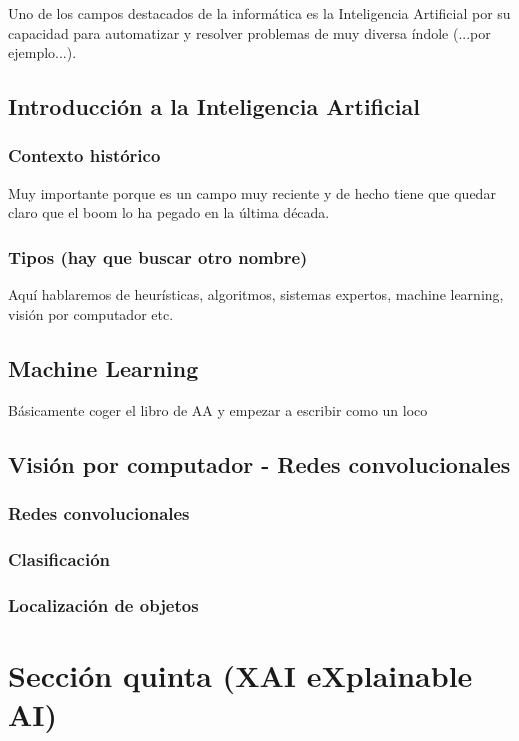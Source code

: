 \documentclass[oneside,openright,titlepage,numbers=noenddot,openany,headinclude,footinclude=true,
cleardoublepage=empty,abstractoff,BCOR=5mm,paper=a4,fontsize=12pt,main=spanish]{scrreprt}
\begin{document}
Uno de los campos destacados de la informática es la Inteligencia Artificial
por su capacidad para automatizar y resolver problemas de muy diversa índole (...{\Large por ejemplo}...).

\section{Introducción a la Inteligencia Artificial}
\subsection{Contexto histórico}
Muy importante porque es un campo muy reciente y de hecho tiene que quedar claro que el boom lo ha pegado en la última década.

\subsection{Tipos (hay que buscar otro nombre)}
Aquí hablaremos de heurísticas, algoritmos, sistemas expertos, machine learning, visión por computador etc.

\section{Machine Learning}
Básicamente coger el libro de AA y empezar a escribir como un loco

\section{Visión por computador - Redes convolucionales}

\subsection{Redes convolucionales}
\subsection{Clasificación}
\subsection{Localización de objetos}


\chapter{Sección quinta (XAI eXplainable AI)}
\end{document}
